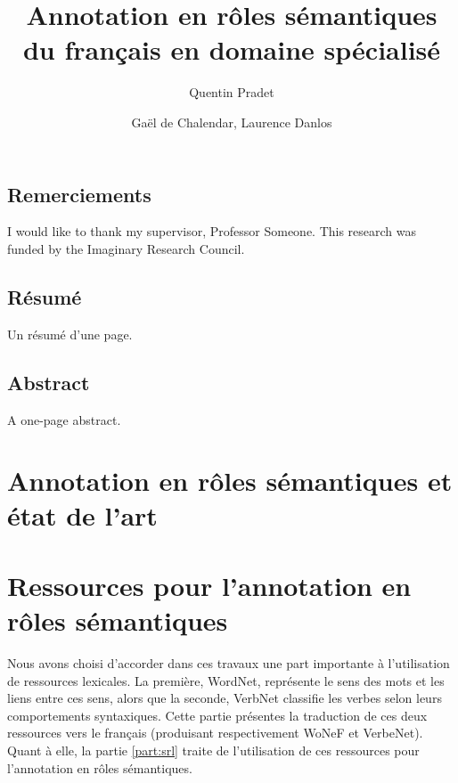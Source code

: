 \documentclass[oneside,parskip,draft]{scrbook}
\title{Annotation en rôles sémantiques \\ du français en domaine spécialisé}
\author{Quentin Pradet}
\date{Gaël de Chalendar, Laurence Danlos}
\begin{document}
\maketitle

\frontmatter

\chapter{Remerciements}

I would like to thank my supervisor, Professor Someone. This
research was funded by the Imaginary Research Council.

\chapter{Résumé}

Un résumé d'une page.

\chapter{Abstract}

A one-page abstract.

\setcounter{tocdepth}{3}
\tableofcontents


\mainmatter


\part{Annotation en rôles sémantiques et état de l'art}





\part{Ressources pour l'annotation en rôles sémantiques}
\label{part:translation}


Nous avons choisi d'accorder dans ces travaux une part importante à
l'utilisation de ressources lexicales. La première, WordNet, représente le sens
des mots et les liens entre ces sens, alors que la seconde, VerbNet classifie
les verbes selon leurs comportements syntaxiques. Cette partie présentes la
traduction de ces deux ressources vers le français (produisant respectivement
WoNeF et VerbeNet). Quant à elle, la partie \ref{part:srl} traite de
l'utilisation de ces ressources pour l'annotation en rôles sémantiques.
\end{document}
